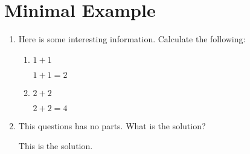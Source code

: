 \documentclass{article}
\begin{document}
\newenvironment{SomeSolutionDividerName}{}{}

\section*{Minimal Example}

\hrulefill

\medskip

\begin{enumerate}

  \item Here is some interesting information. Calculate the following:

        \begin{enumerate}
          \item $1+1$

                \begin{SomeSolutionDividerName}
                  $1+1=2$
                \end{SomeSolutionDividerName}

          \item $2+2$

                \begin{SomeSolutionDividerName}
                  $2+2=4$
                \end{SomeSolutionDividerName}
        \end{enumerate}

  \item This questions has no parts. What is the solution?

        \begin{SomeSolutionDividerName}
          This is the solution.
        \end{SomeSolutionDividerName}

\end{enumerate}
\end{document}
